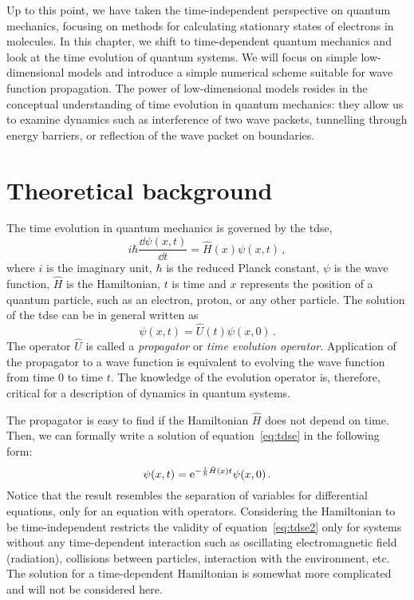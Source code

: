 Up to this point, we have taken the time-independent perspective on quantum mechanics, focusing on methods for calculating stationary states of electrons in molecules. In this chapter, we shift to time-dependent quantum mechanics and look at the time evolution of quantum systems. We will focus on simple low-dimensional models and introduce a simple numerical scheme suitable for wave function propagation. The power of low-dimensional models resides in the conceptual understanding of time evolution in quantum mechanics: they allow us to examine dynamics such as interference of two wave packets, tunnelling through energy barriers, or reflection of the wave packet on boundaries.

\section{Theoretical background}
\label{sec:qdtheoback}

The time evolution in quantum mechanics is governed by the \acrfull{tdse},
\begin{equation}
    i\hbar\frac{\dd\psi(x,t)}{\dd t} = \hat{H}(x)\psi(x,t) \, ,
    \label{eq:tdse}
\end{equation}
where $i$ is the imaginary unit, $\hbar$ is the reduced Planck constant, $\psi$ is the wave function, $\hat{H}$ is the Hamiltonian, $t$ is time and $x$ represents the position of a quantum particle, such as an electron, proton, or any other particle. The solution of the \acrshort{tdse} can be in general written as
\begin{equation}
    \psi(x,t) = \hat{U}(t)\psi(x,0) \, .
    \label{eq:U}
\end{equation}
The operator $\hat{U}$ is called a \textit{propagator} or \textit{time evolution operator}. Application of the propagator to a wave function is equivalent to evolving the wave function from time 0 to time $t$. The knowledge of the evolution operator is, therefore, critical for a description of dynamics in quantum systems.

The propagator is easy to find if the Hamiltonian $\hat{H}$ does not depend on time. Then, we can formally write a solution of equation~\eqref{eq:tdse} in the following form:
\begin{equation}
    \psi(x,t) = \mathrm{e}^{-\frac{i}{\hbar}\hat{H}(x)t} \psi(x,0)\, .
    \label{eq:tdse2}
\end{equation}
Notice that the result resembles the separation of variables for differential equations, only for an equation with operators. Considering the Hamiltonian to be time-independent restricts the validity of equation~\eqref{eq:tdse2} only for systems without any time-dependent interaction such as oscillating electromagnetic field (radiation), collisions between particles, interaction with the environment, etc. The solution for a time-dependent Hamiltonian is somewhat more complicated and will not be considered here.

